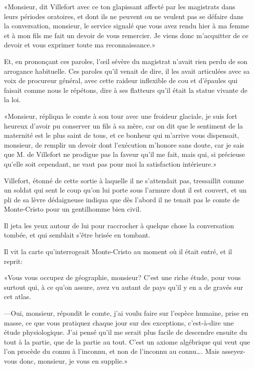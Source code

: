 «Monsieur, dit Villefort avec ce ton glapissant affecté par les magistrats dans leurs périodes oratoires, et dont ils ne peuvent ou ne veulent pas se défaire dans la conversation, monsieur, le service signalé que vous avez rendu hier à ma femme et à mon fils me fait un devoir de vous remercier. Je viens donc m'acquitter de ce devoir et vous exprimer toute ma reconnaissance.» 

Et, en prononçant ces paroles, l'œil sévère du magistrat n'avait rien perdu de son arrogance habituelle. Ces paroles qu'il venait de dire, il les avait articulées avec sa voix de procureur général, avec cette raideur inflexible de cou et d'épaules qui faisait comme nous le répétons, dire à ses flatteurs qu'il était la statue vivante de la loi. 

«Monsieur, répliqua le comte à son tour avec une froideur glaciale, je suis fort heureux d'avoir pu conserver un fils à sa mère, car on dit que le sentiment de la maternité est le plus saint de tous, et ce bonheur qui m'arrive vous dispensait, monsieur, de remplir un devoir dont l'exécution m'honore sans doute, car je sais que M. de Villefort ne prodigue pas la faveur qu'il me fait, mais qui, si précieuse qu'elle soit cependant, ne vaut pas pour moi la satisfaction intérieure.» 

Villefort, étonné de cette sortie à laquelle il ne s'attendait pas, tressaillit comme un soldat qui sent le coup qu'on lui porte sous l'armure dont il est couvert, et un pli de sa lèvre dédaigneuse indiqua que dès l'abord il ne tenait pas le comte de Monte-Cristo pour un gentilhomme bien civil. 

Il jeta les yeux autour de lui pour raccrocher à quelque chose la conversation tombée, et qui semblait s'être brisée en tombant. 

Il vit la carte qu'interrogeait Monte-Cristo au moment où il était entré, et il reprit: 

«Vous vous occupez de géographie, monsieur? C'est une riche étude, pour vous surtout qui, à ce qu'on assure, avez vu autant de pays qu'il y en a de gravés sur cet atlas. 

—Oui, monsieur, répondit le comte, j'ai voulu faire sur l'espèce humaine, prise en masse, ce que vous pratiquez chaque jour sur des exceptions, c'est-à-dire une étude physiologique. J'ai pensé qu'il me serait plus facile de descendre ensuite du tout à la partie, que de la partie au tout. C'est un axiome algébrique qui veut que l'on procède du connu à l'inconnu, et non de l'inconnu au connu\dots. Mais asseyez-vous donc, monsieur, je vous en supplie.» 

